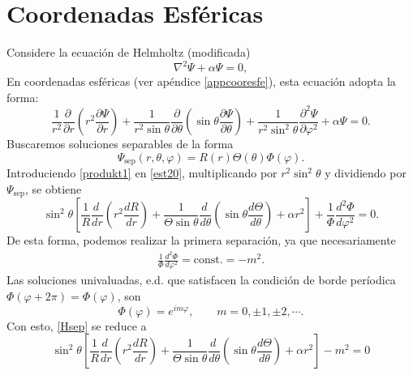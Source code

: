 \section{Coordenadas Esféricas}
Considere la ecuación de Helmholtz (modificada)
\begin{equation}\label{ecHelmholtz}
    \nabla^2\Psi+\alpha\Psi=0,
\end{equation}
En coordenadas esféricas (ver apéndice \ref{appcooresfe}), esta ecuación adopta la forma:
\begin{equation}
    \frac{1}{r^2}\frac{\partial\ }{\partial r}\left(r^2\frac{\partial\Psi}{\partial r}\right)
    +\frac{1}{r^2\sin\theta}\frac{\partial}{\partial\theta}\left(\sin\theta\frac{
        \partial\Psi}{\partial\theta}\right) + \frac{1}{r^2\sin^2  \theta}
    \frac{\partial^2\Psi}{\partial \varphi^2}  +\alpha\Psi= 0.\label{est20}
\end{equation}
Buscaremos soluciones separables de la forma
\begin{equation}\label{produkt1}
    \Psi_\text{sep}(r,\theta,\varphi) = R(r)\Theta(\theta)\Phi(\varphi).
\end{equation}
Introduciendo \eqref{produkt1} en \eqref{est20}, multiplicando por $r^2\sin^2\theta$ y dividiendo por $\Psi_\text{sep}$, se obtiene
\begin{equation}\label{Hsep}
    \sin^2\theta\left[\frac{1}{R}\frac{d\ }{dr}\left(r^2\frac{dR}{dr}\right) +
        \frac{1}{\Theta\sin\theta}\frac{d\ }{d\theta}\left(\sin\theta\frac{
            d\Theta}{d\theta}\right) +\alpha r^2\right]+ \frac{1}{\Phi}\frac{d^2 \Phi}{d\varphi^2} = 0.
\end{equation}
De esta forma, podemos realizar la primera separación, ya que necesariamente
\begin{eqnarray}
    \frac{1}{\Phi} \frac{d^2\Phi}{d\varphi^2} = \text{const.} = -m^2. \end{eqnarray}\label{loes1}
Las soluciones univaluadas, e.d. que satisfacen la condición de borde períodica $\Phi(\varphi+2\pi)=\Phi(\varphi)$, son
\begin{equation}\label{Phim}
    \Phi (\varphi) = e^{im\varphi}, \qquad m=0,\pm 1,\pm 2, \cdots .
\end{equation}
Con esto, \eqref{Hsep} se reduce a
\begin{equation}
    \sin^2\theta\left[\frac{1}{R}\frac{d\ }{dr}\left(r^2\frac{dR}{dr}\right) +
        \frac{1}{\Theta\sin\theta}\frac{d\ }{d\theta}\left(\sin\theta\frac{
            d\Theta}{d\theta}\right) +\alpha r^2\right]-m^2 = 0
\end{equation}
